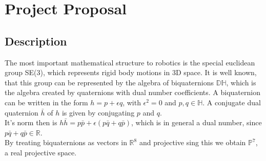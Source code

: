 \chapter{Project Proposal}

\section{Description}
The most important mathematical structure to robotics is the special euclidean group SE(3), which represents rigid body motions in 3D space\cite{selig}. 
It is well known, that this group can be represented by the algebra of biquaternions $\mathbb{DH}$, which is the algebra created by quaternions with dual number coefficients\cite{selig}. A biquaternion can be written in the form $h = p + \epsilon q$, with $\epsilon^2 = 0$ and $p,q \in \mathbb{H}$. A conjugate dual quaternion $\bar{h}$ of $h$ is given by conjugating $p$ and $q$.\\
It's norm then is $h\bar{h} = p\bar{p} + \epsilon(p\bar{q} + q\bar{p})$, which is in general a dual number, since $p\bar{q} + q\bar{p} \in \mathbb{R}$.\\
By treating biquaternions as vectors in $\mathbb{R}^{8}$ and projective sing this we obtain $\mathbb{P}^{7}$, a real projective space\cite{Heged_s_2013}.


